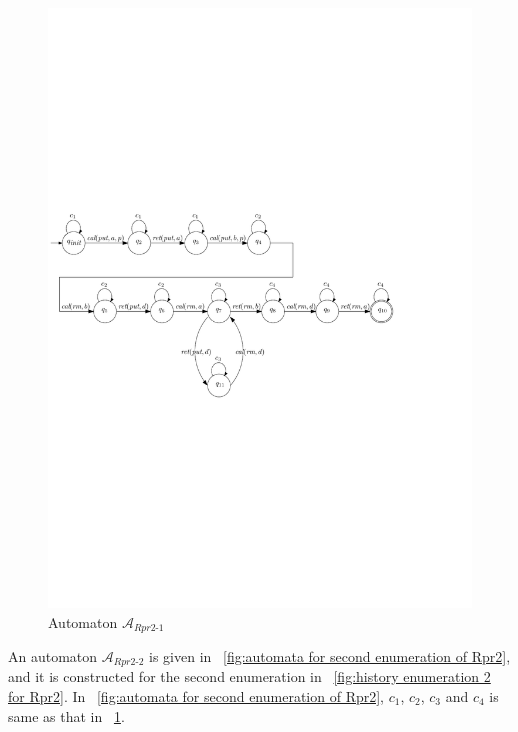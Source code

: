 \documentclass{llncs}
\begin{document}
\begin{figure}[htbp]
  \centering
  \includegraphics[width=0.8 \textwidth]{PIC_AUTO_Rpr2_1.pdf}
  \caption{Automaton $\mathcal{A}_{\textit{Rpr2-1}}$}
  \label{fig:automata for first enumeration of Rpr2}
\end{figure}


An automaton $\mathcal{A}_{\textit{Rpr2-2}}$ is given in \figurename~\ref{fig:automata for second enumeration of Rpr2}, and it is constructed for the second enumeration in \figurename~\ref{fig:history enumeration 2 for Rpr2}. In \figurename~\ref{fig:automata for second enumeration of Rpr2}, $c_1$, $c_2$, $c_3$ and $c_4$ is same as that in \figurename~\ref{fig:automata for first enumeration of Rpr2}.
\end{document}
